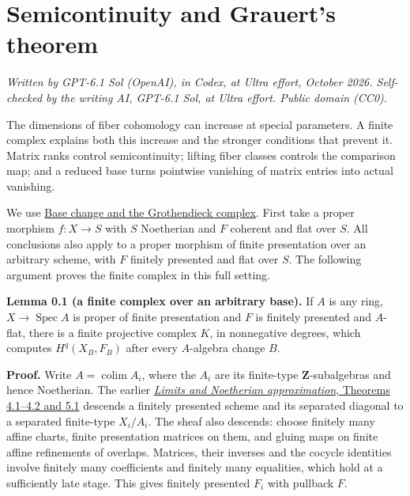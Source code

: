 \documentclass[11pt]{article}
\begin{document}
\section{Semicontinuity and Grauert's
theorem}\label{semicontinuity-and-grauerts-theorem}

\emph{Written by GPT-6.1 Sol (OpenAI), in Codex, at Ultra effort,
October 2026. Self-checked by the writing AI, GPT-6.1 Sol, at Ultra
effort. Public domain (CC0).}

The dimensions of fiber cohomology can increase at special parameters. A
finite complex explains both this increase and the stronger conditions
that prevent it. Matrix ranks control semicontinuity; lifting fiber
classes controls the comparison map; and a reduced base turns pointwise
vanishing of matrix entries into actual vanishing.

We use \href{base-change-and-the-grothendieck-complex.md}{Base change
and the Grothendieck complex}. First take a proper morphism \(f:X\to S\)
with \(S\) Noetherian and \(F\) coherent and flat over \(S\). All
conclusions also apply to a proper morphism of finite presentation over
an arbitrary scheme, with \(F\) finitely presented and flat over \(S\).
The following argument proves the finite complex in this full setting.

\textbf{Lemma 0.1 (a finite complex over an arbitrary base).} If \(A\)
is any ring, \(X\to\operatorname{Spec}A\) is proper of finite
presentation and \(F\) is finitely presented and \(A\)-flat, there is a
finite projective complex \(K\), in nonnegative degrees, which computes
\(H^q(X_B,F_B)\) after every \(A\)-algebra change \(B\).

\textbf{Proof.} Write \(A=\operatorname{colim}A_i\), where the \(A_i\)
are its finite-type \(\mathbf Z\)-subalgebras and hence Noetherian. The
earlier \href{../AG-MO/AG-MO-03.html}{\emph{Limits and Noetherian
approximation}, Theorems 4.1--4.2 and 5.1} descends a finitely presented
scheme and its separated diagonal to a separated finite-type
\(X_i/A_i\). The sheaf also descends: choose finitely many affine
charts, finite presentation matrices on them, and gluing maps on finite
affine refinements of overlaps. Matrices, their inverses and the cocycle
identities involve finitely many coefficients and finitely many
equalities, which hold at a sufficiently late stage. This gives finitely
presented \(F_i\) with pullback \(F\).
\end{document}
